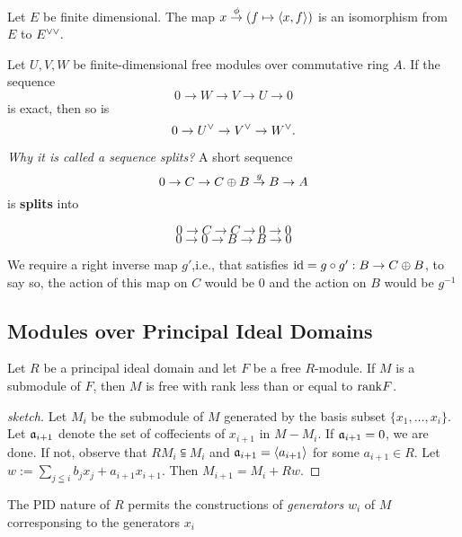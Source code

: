     \begin{theorem}
        Let $E$ be finite dimensional. The map $x \overset{\phi}{\to} (f \mapsto \langle x, f \rangle)$ is an isomorphism from $E$ to $E^{\vee \vee}.$
    \end{theorem}

    \begin{theorem}

        Let $U, V, W$ be finite-dimensional free modules over commutative ring $A$. If the sequence
        $$0 \to W \to V \to U \to 0$$
        is exact, then so is
        $$ 0 \to U^{\vee} \to V^{\vee} \to W^{\vee}.$$
    \end{theorem}

    \horline
    \noindent \textit{Why it is called a sequence splits?}
    A short sequence
    $$0 \to C \to C \oplus B \overset{g}{\to} B \to  A$$
    is \textbf{splits} into

    $$0 \to C \to C \to 0 \to 0$$
    $$0 \to 0 \to B \to B \to 0$$

    We require a right inverse map $g'$,i.e., that satisfies $\text{id} = g \circ g': B \to C \oplus B$, to say so, the action of this map on $C$ would be $0$ and the action on $B$ would be $g^{-1}$ \\
    \horline

    \subsection*{Modules over Principal Ideal Domains}
    \begin{theorem}
        Let $R$ be a principal ideal domain and let $F$ be a free $R$-module. If $M$ is a submodule of $F$, then $M$ is free with rank less than or equal to $\mathrm{rank} F$. 
    \end{theorem}
    \begin{proof}[sketch]
        Let $M_i$ be the submodule of $M$ generated by the basis subset $\{x_1, \dots ,x_i\}$. Let $\mathfrak{a}_{i+1}$ denote the set of coffecients of $x_{i+1}$ in $M - M_i.$ If $\mathfrak{a}_{i + 1} = 0$, we are done. If not, observe that $RM_i \subseteqq M_i$ and $\mathfrak{a}_{i+1} = \langle a_{i+1} \rangle$ for some $a_{i+1} \in  R.$ Let $w := \sum_{j \leqq i} b_jx_j + a_{i+1}x_{i+1}$. Then $M_{i+1} = M_i + Rw.$
    \end{proof}
    \begin{remark}
        The PID nature of $R$ permits the constructions of  \textit{generators} $w_i$ of $M$ corresponsing   to the generators $x_i$
    \end{remark}

